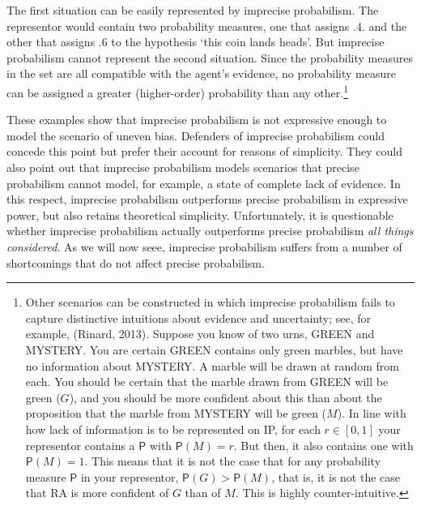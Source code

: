 \documentclass[
  letterpaper,
  DIV=11,
  numbers=noendperiod]{scrartcl}
\newcommand{\pr}[1]{\mathsf{P}(#1)}
\begin{document}
\noindent The first situation can be easily represented by imprecise
probabilism. The representor would contain two probability measures, one
that assigns .4. and the other that assigns .6 to the hypothesis `this
coin lands heads'. But imprecise probabilism cannot represent the second
situation. Since the probability measures in the set are all compatible
with the agent's evidence, no probability measure can be assigned a
greater (higher-order) probability than any other.\footnote{Other
  scenarios can be constructed in which imprecise probabilism fails to
  capture distinctive intuitions about evidence and uncertainty; see,
  for example, (Rinard, 2013). Suppose you know of two urns,
  \textsf{GREEN} and \textsf{MYSTERY}. You are certain \textsf{GREEN}
  contains only green marbles, but have no information about
  \textsf{MYSTERY}. A marble will be drawn at random from each. You
  should be certain that the marble drawn from \textsf{GREEN} will be
  green (\(G\)), and you should be more confident about this than about
  the proposition that the marble from \textsf{MYSTERY} will be green
  (\(M\)). In line with how lack of information is to be represented on
  \textsf{IP}, for each \(r\in [0,1]\) your representor contains a
  \(\mathsf{P}\) with \(\pr{M}=r\). But then, it also contains one with
  \(\pr{M}=1\). This means that it is not the case that for any
  probability measure \(\mathsf{P}\) in your representor,
  \(\mathsf{P}(G) > \mathsf{P}(M)\), that is, it is not the case that RA
  is more confident of \(G\) than of \(M\). This is highly
  counter-intuitive.}

These examples show that imprecise probabilism is not expressive enough
to model the scenario of uneven bias. Defenders of imprecise probabilism
could concede this point but prefer their account for reasons of
simplicity. They could also point out that imprecise probabilism models
scenarios that precise probabilism cannot model, for example, a state of
complete lack of evidence. In this respect, imprecise probabilism
outperforms precise probabilism in expressive power, but also retains
theoretical simplicity. Unfortunately, it is questionable whether
imprecise probabilism actually outperforms precise probabilism \emph{all
things considered}. As we will now seee, imprecise probabilism suffers
from a number of shortcomings that do not affect precise probabilism.
\end{document}
